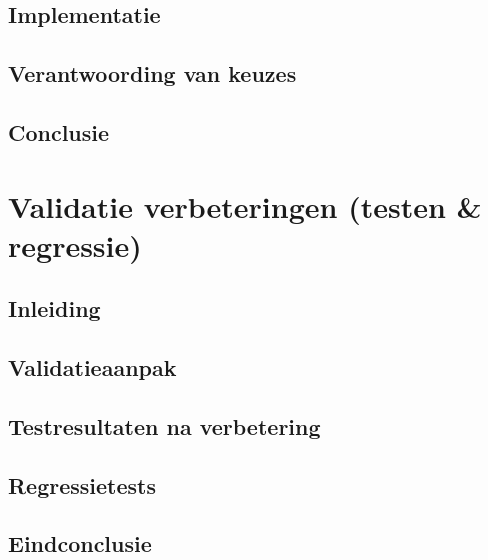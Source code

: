 \documentclass[11pt, a4paper]{report}
\begin{document}
\section{Implementatie}

\section{Verantwoording van keuzes}

\section{Conclusie}


\chapter{Validatie verbeteringen (testen \& regressie)}

\section{Inleiding}

\section{Validatieaanpak}

\section{Testresultaten na verbetering}

\section{Regressietests}

\section{Eindconclusie}


\end{document}

